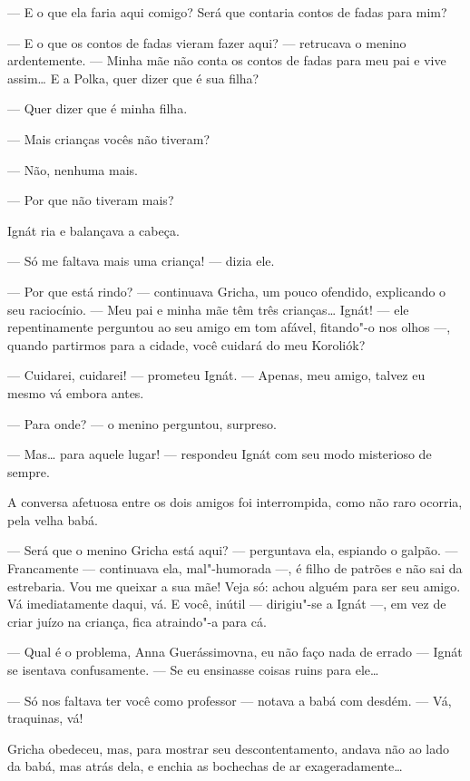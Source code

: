 --- E o que ela faria aqui comigo? Será que contaria contos de fadas
para mim?

--- E o que os contos de fadas vieram fazer aqui? --- retrucava o menino
ardentemente. --- Minha mãe não conta os contos de fadas para meu pai e
vive assim\ldots{} E a Polka, quer dizer que é sua filha?

--- Quer dizer que é minha filha.

--- Mais crianças vocês não tiveram?

--- Não, nenhuma mais.

--- Por que não tiveram mais?

Ignát ria e balançava a cabeça.

--- Só me faltava mais uma criança! --- dizia ele.

--- Por que está rindo? --- continuava Gricha, um pouco ofendido,
explicando o seu raciocínio. --- Meu pai e minha mãe têm três
crianças\ldots{} Ignát! --- ele repentinamente perguntou ao seu amigo em tom
afável, fitando"-o nos olhos ---, quando partirmos para a cidade, você
cuidará do meu Koroliók?

--- Cuidarei, cuidarei! --- prometeu Ignát. --- Apenas, meu amigo,
talvez eu mesmo vá embora antes.

--- Para onde? --- o menino perguntou, surpreso.

--- Mas\ldots{} para aquele lugar! --- respondeu Ignát com seu modo
misterioso de sempre.

A conversa afetuosa entre os dois amigos foi interrompida, como não raro
ocorria, pela velha babá.

--- Será que o menino Gricha está aqui? --- perguntava ela, espiando o
galpão. --- Francamente --- continuava ela, mal"-humorada ---, é filho de
patrões e não sai da estrebaria. Vou me queixar a sua mãe! Veja só:
achou alguém para ser seu amigo. Vá imediatamente daqui, vá. E você,
inútil --- dirigiu"-se a Ignát ---, em vez de criar juízo na criança,
fica atraindo"-a para cá.

--- Qual é o problema, Anna Guerássimovna, eu não faço nada de errado
--- Ignát se isentava confusamente. --- Se eu ensinasse coisas ruins
para ele\ldots{}

--- Só nos faltava ter você como professor --- notava a babá com desdém.
--- Vá, traquinas, vá!

Gricha obedeceu, mas, para mostrar seu descontentamento, andava não ao
lado da babá, mas atrás dela, e enchia as bochechas de ar
exageradamente\ldots{}

